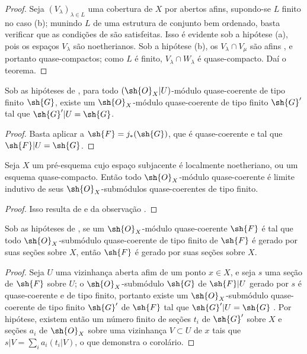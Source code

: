 \documentclass[oneside]{amsart}
\newcommand{\oldpage}[2][]{{\marginnote{\normalfont\textbf{#1}~|~#2}}\ignorespaces}
\let\EGAOriginalLabel\label
\renewcommand{\label}[1]{\phantomsection\EGAOriginalLabel{#1}}
\begin{document}
\oldpage[I]{176}
\begin{proof}
Seja $(V_\lambda)_{\lambda\in L}$ uma cobertura de $X$ por abertos afins,
supondo-se $L$ finito no caso (b); munindo $L$ de uma estrutura de conjunto bem
ordenado, basta verificar que as condições de  são satisfeitas. Isso é
evidente sob a hipótese (a), pois os espaços $V_\lambda$ são noetherianos. Sob a
hipótese (b), os $V_\lambda\cap V_\mu$ são afins , e portanto
quase-compactos; como $L$ é finito, $V_\lambda\cap W_\lambda$ é quase-compacto. Daí o
teorema.
\end{proof}

\begin{corollary}[9.4.8]
\label{I.9.4.8}
Sob as hipóteses de , para todo $(\sh{O}_X|U)$-módulo quase-coerente
de tipo finito $\sh{G}$, existe um $\sh{O}_X$-módulo quase-coerente de tipo finito
$\sh{G}'$ tal que $\sh{G}'|U=\sh{G}$.
\end{corollary}

\begin{proof}
Basta aplicar  a $\sh{F}=j_*(\sh{G})$, que é quase-coerente
 e tal que $\sh{F}|U=\sh{G}$.
\end{proof}

\begin{corollary}[9.4.9]
\label{I.9.4.9}
Seja $X$ um pré-esquema cujo espaço subjacente é localmente noetheriano, ou um esquema
quase-compacto. Então todo $\sh{O}_X$-módulo quase-coerente é limite indutivo de seus
$\sh{O}_X$-submódulos quase-coerentes de tipo finito.
\end{corollary}

\begin{proof}
Isso resulta de  e da observação .
\end{proof}

\begin{corollary}[9.4.10]
\label{I.9.4.10}
Sob as hipóteses de , se um $\sh{O}_X$-módulo quase-coerente
$\sh{F}$ é tal que todo $\sh{O}_X$-submódulo quase-coerente de tipo finito de $\sh{F}$
é gerado por suas seções sobre $X$, então $\sh{F}$ é gerado por suas
seções sobre $X$.
\end{corollary}

\begin{proof}
Seja $U$ uma vizinhança aberta afim de um ponto $x\in X$, e seja $s$ uma seção de
$\sh{F}$ sobre $U$; o $\sh{O}_X$-submódulo $\sh{G}$ de $\sh{F}|U$ gerado por $s$ é
quase-coerente e de tipo finito, portanto existe um $\sh{O}_X$-submódulo quase-coerente
de tipo finito $\sh{G}'$ de $\sh{F}$ tal que $\sh{G}'|U=\sh{G}$ . Por
hipótese, existem então um número finito de seções $t_i$ de $\sh{G}'$ sobre $X$ e
seções $a_i$ de $\sh{O}_X$ sobre uma vizinhança $V\subset U$ de $x$ tais que
$s|V=\sum_i a_i(t_i|V)$, o que demonstra o corolário.
\end{proof}
\end{document}
